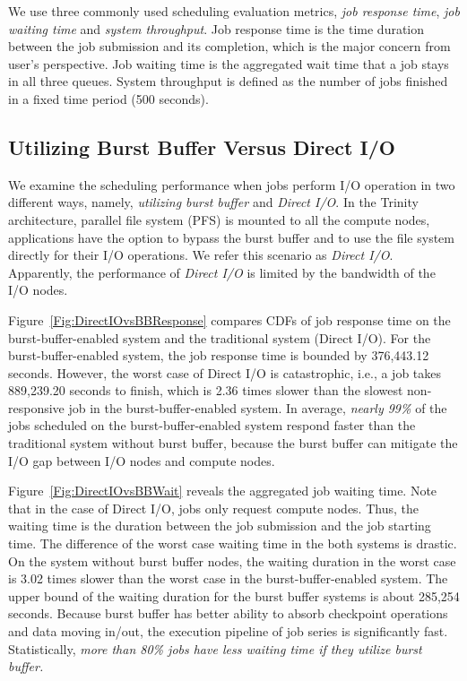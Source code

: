We use three commonly used scheduling evaluation metrics,
\textit{job response time}, \textit{job waiting time} and \textit{system throughput}.
Job response time is the time duration between the job submission and its completion,
which is the major concern from user's perspective. 
Job waiting time is the aggregated wait time that a job stays in all three queues.
System throughput is defined as the number of jobs finished in
a fixed time period (500 seconds).


\subsection{Utilizing Burst Buffer Versus Direct I/O}
\label{Sec:Sim:DirectIOvsBB}

We examine the scheduling performance when 
jobs perform I/O operation in two different ways, 
namely, \textit{utilizing burst buffer} and \textit{Direct I/O}.
In the Trinity architecture, parallel file system (PFS) is mounted to all the compute nodes,
applications have the option to bypass the burst buffer 
and to use the file system directly for their I/O operations.
We refer this scenario as \textit{Direct I/O}. 
Apparently, the performance of \textit{Direct I/O}
is limited by the bandwidth of the I/O nodes. 

Figure~\ref{Fig:DirectIOvsBBResponse} compares CDFs of job response
time on the burst-buffer-enabled system and the traditional system (Direct I/O).
For the burst-buffer-enabled system, the job response time is bounded by 376,443.12 seconds.
However, the worst case of Direct I/O is catastrophic, 
i.e., a job takes 889,239.20 seconds to finish,
which is 2.36 times slower than the slowest non-responsive job
in the burst-buffer-enabled system.
In average, \textit{nearly 99\%} of the jobs scheduled on the burst-buffer-enabled system
respond faster than the traditional system without burst buffer, because the burst buffer can mitigate the I/O gap between I/O nodes and compute nodes.


Figure~\ref{Fig:DirectIOvsBBWait} reveals the aggregated job waiting time.
Note that in the case of Direct I/O, jobs only request compute nodes.
Thus, the waiting time is the duration between the job submission and the job starting time.
The difference of the worst case waiting time in the both systems is drastic.
On the system without burst buffer nodes, the waiting duration in the worst case is 3.02 times
slower than the worst case in the burst-buffer-enabled system.
The upper bound of the waiting duration for the burst buffer systems is about 285,254 seconds.
Because burst buffer has better ability to absorb checkpoint operations and data moving in/out,
the execution pipeline of job series is significantly fast.
Statistically, \textit{more than 80\% jobs have less waiting time if they utilize burst buffer.}

